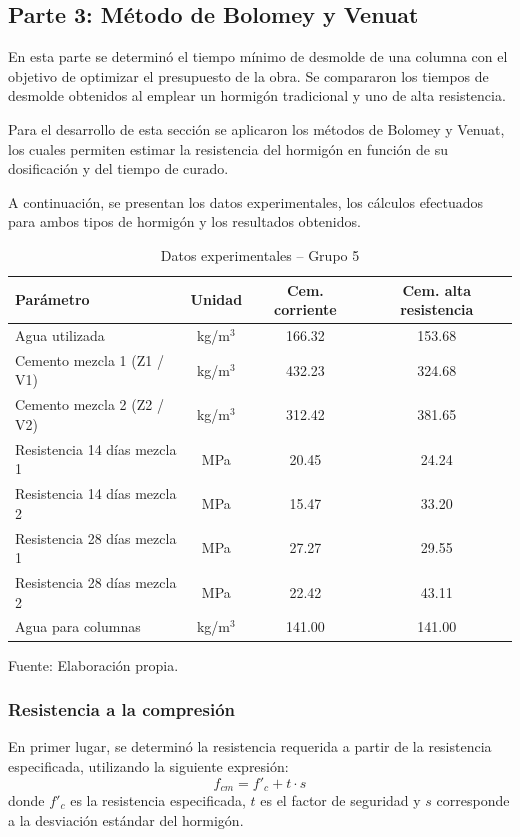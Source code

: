 \subsection*{Parte 3: Método de Bolomey y Venuat}

En esta parte se determinó el tiempo mínimo de desmolde de una columna con el objetivo de optimizar el presupuesto de la obra. Se compararon los tiempos de desmolde obtenidos al emplear un hormigón tradicional y uno de alta resistencia.  

Para el desarrollo de esta sección se aplicaron los métodos de Bolomey y Venuat, los cuales permiten estimar la resistencia del hormigón en función de su dosificación y del tiempo de curado.

A continuación, se presentan los datos experimentales, los cálculos efectuados para ambos tipos de hormigón y los resultados obtenidos.

\begin{table}[H]
\centering
\renewcommand{\arraystretch}{1.15}
\caption{Datos experimentales – Grupo 5}
\small
\begin{tabular}{lccc}
\hline
\textbf{Parámetro} & \textbf{Unidad} & \textbf{Cem. corriente} & \textbf{Cem. alta resistencia} \\ \hline
Agua utilizada & kg/m$^3$ & 166.32 & 153.68 \\
Cemento mezcla 1 (Z1 / V1) & kg/m$^3$ & 432.23 & 324.68 \\
Cemento mezcla 2 (Z2 / V2) & kg/m$^3$ & 312.42 & 381.65 \\
Resistencia 14 días mezcla 1 & MPa & 20.45 & 24.24 \\
Resistencia 14 días mezcla 2 & MPa & 15.47 & 33.20 \\
Resistencia 28 días mezcla 1 & MPa & 27.27 & 29.55 \\
Resistencia 28 días mezcla 2 & MPa & 22.42 & 43.11 \\
Agua para columnas & kg/m$^3$ & 141.00 & 141.00 \\ \hline
\end{tabular}
\begin{center}
Fuente: Elaboración propia.
\end{center}
\end{table}

\subsubsection*{Resistencia a la compresión}

En primer lugar, se determinó la resistencia requerida a partir de la resistencia especificada, utilizando la siguiente expresión:
\[
f_{cm} = f'_c + t \cdot s
\]
donde $f'_c$ es la resistencia especificada, $t$ es el factor de seguridad y $s$ corresponde a la desviación estándar del hormigón.

